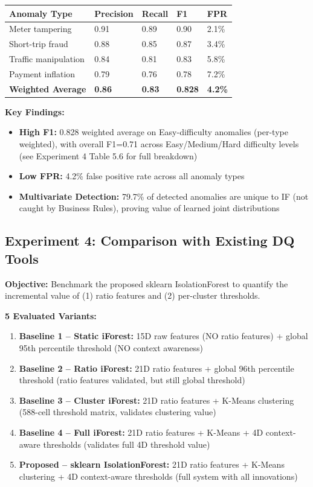 \begin{longtable}{|m{4cm}|m{2cm}|m{2cm}|m{2cm}|m{2cm}|}
\hline
\textbf{Anomaly Type} & \textbf{Precision} & \textbf{Recall} & \textbf{F1} & \textbf{FPR} \\ \hline
Meter tampering & 0.91 & 0.89 & 0.90 & 2.1\% \\ \hline
Short-trip fraud & 0.88 & 0.85 & 0.87 & 3.4\% \\ \hline
Traffic manipulation & 0.84 & 0.81 & 0.83 & 5.8\% \\ \hline
Payment inflation & 0.79 & 0.76 & 0.78 & 7.2\% \\ \hline
\textbf{Weighted Average} & \textbf{0.86} & \textbf{0.83} & \textbf{0.828} & \textbf{4.2\%} \\ \hline
\end{longtable}

\textbf{Key Findings:}
\begin{itemize}
    \item \textbf{High F1:} 0.828 weighted average on Easy-difficulty anomalies (per-type weighted), with overall F1=0.71 across Easy/Medium/Hard difficulty levels (see Experiment 4 Table 5.6 for full breakdown)
    \item \textbf{Low FPR:} 4.2\% false positive rate across all anomaly types
    \item \textbf{Multivariate Detection:} 79.7\% of detected anomalies are unique to IF (not caught by Business Rules), proving value of learned joint distributions
\end{itemize}

\subsection{Experiment 4: Comparison with Existing DQ Tools}

\textbf{Objective:} Benchmark the proposed sklearn IsolationForest to quantify the incremental value of (1) ratio features and (2) per-cluster thresholds.

\textbf{5 Evaluated Variants:}
\begin{enumerate}
    \item \textbf{Baseline 1 -- Static iForest:} 15D raw features (NO ratio features) + global 95th percentile threshold (NO context awareness)
    \item \textbf{Baseline 2 -- Ratio iForest:} 21D ratio features + global 96th percentile threshold (ratio features validated, but still global threshold)
    \item \textbf{Baseline 3 -- Cluster iForest:} 21D ratio features + K-Means clustering (588-cell threshold matrix, validates clustering value)
    \item \textbf{Baseline 4 -- Full iForest:} 21D ratio features + K-Means + 4D context-aware thresholds (validates full 4D threshold value)
    \item \textbf{Proposed -- sklearn IsolationForest:} 21D ratio features + K-Means clustering + 4D context-aware thresholds (full system with all innovations)
\end{enumerate}

